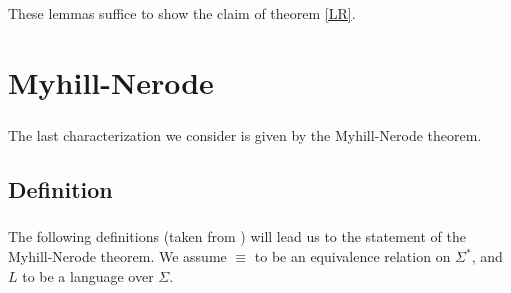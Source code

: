 \documentclass[11pt,a4paper,oneside]{book}
\begin{document}

                        \paragraph{}
                            These lemmas suffice to show the claim of theorem \ref{LR}.
                            

            \paragraph{} 


            

    \chapter{Myhill-Nerode}

        \paragraph{}

        The last characterization we consider is given by the Myhill-Nerode theorem.

        \section{Definition}

            \paragraph{}

            The following definitions (taken from \cite{DBLP:books/daglib/0088160}) will lead us to the statement of the Myhill-Nerode theorem.
            We assume $\equiv$ to be an equivalence relation on $\Sigma^*$, and $L$ to be a language over $\Sigma$.
\end{document}
